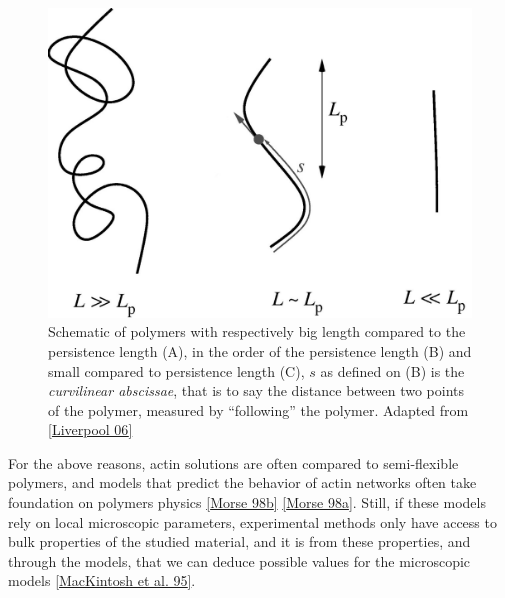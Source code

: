 \documentclass[A4paperpaper,11pt,english]{sphinxmanual}
\begin{document}
\begin{figure}[htbp]
\centering
\capstart

\includegraphics[width=0.600\linewidth]{F2_large.jpg}
\caption{Schematic of polymers with respectively big length compared to the persistence
length (A), in the order of the persistence length (B) and small compared
to persistence length (C), \(s\) as defined on (B) is the \emph{curvilinear
abscissae}, that is to say the distance between two points of the polymer,
measured by ``following'' the polymer. Adapted from {\hyperref[index-latex:liverpool2006]{{[}Liverpool 06{]}}}}\label{index-latex:fig-persistence-length}\end{figure}

For the above reasons, actin solutions are often compared to semi-flexible
polymers, and models that predict the behavior of actin networks often take
foundation on polymers physics {\hyperref[index-latex:morse1998b]{{[}Morse 98b{]}}} {\hyperref[index-latex:morse1998a]{{[}Morse 98a{]}}}. Still, if
these models rely on local microscopic parameters, experimental methods only
have access to bulk properties of the studied material, and it is from these
properties, and through the models, that we can deduce possible values for the
microscopic models {\hyperref[index-latex:mackintosh1995]{{[}MacKintosh et al. 95{]}}}.
\end{document}
